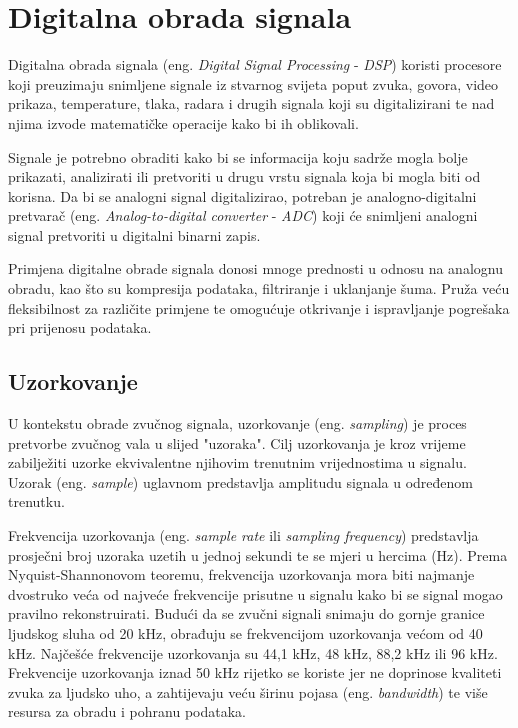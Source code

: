 \documentclass[times, utf8, diplomski, numeric]{fer}
\begin{document}
\chapter{Digitalna obrada signala}
Digitalna obrada signala (eng. \textit{Digital Signal Processing} - \textit{DSP}) koristi procesore koji preuzimaju snimljene signale iz stvarnog svijeta poput zvuka, govora, video prikaza, temperature, tlaka, radara i drugih signala koji su digitalizirani te nad njima izvode matematičke operacije kako bi ih oblikovali.

Signale je potrebno obraditi kako bi se informacija koju sadrže mogla bolje prikazati, analizirati ili pretvoriti u drugu vrstu signala koja bi mogla biti od korisna. Da bi se analogni signal digitalizirao, potreban je analogno-digitalni pretvarač (eng. \textit{Analog-to-digital converter} - \textit{ADC}) koji će snimljeni analogni signal pretvoriti u digitalni binarni zapis.

Primjena digitalne obrade signala donosi mnoge prednosti u odnosu na analognu obradu, kao što su kompresija podataka, filtriranje i uklanjanje šuma. Pruža veću fleksibilnost za različite primjene te omogućuje otkrivanje i ispravljanje pogrešaka pri prijenosu podataka.\cite{broesch2008digital}

\section{Uzorkovanje}
U kontekstu obrade zvučnog signala, uzorkovanje (eng. \textit{sampling}) je proces pretvorbe zvučnog vala u slijed "uzoraka". Cilj uzorkovanja je kroz vrijeme zabilježiti uzorke ekvivalentne njihovim trenutnim vrijednostima u signalu. Uzorak (eng. \textit{sample}) uglavnom predstavlja amplitudu signala u određenom trenutku.

Frekvencija uzorkovanja (eng. \textit{sample rate} ili \textit{sampling frequency}) predstavlja prosječni broj uzoraka uzetih u jednoj sekundi te se mjeri u hercima (Hz). Prema Nyquist-Shannonovom teoremu, frekvencija uzorkovanja mora biti najmanje dvostruko veća od najveće frekvencije prisutne u signalu kako bi se signal mogao pravilno rekonstruirati.\cite{candes2008introduction} Budući da se zvučni signali snimaju do gornje granice ljudskog sluha od 20 kHz, obrađuju se frekvencijom uzorkovanja većom od 40 kHz. Najčešće frekvencije uzorkovanja su 44,1 kHz, 48 kHz, 88,2 kHz ili 96 kHz.\cite{self2012audio} Frekvencije uzorkovanja iznad 50 kHz rijetko se koriste jer ne doprinose kvaliteti zvuka za ljudsko uho, a zahtijevaju veću širinu pojasa (eng. \textit{bandwidth}) te više resursa za obradu i pohranu podataka.
%
\end{document}
